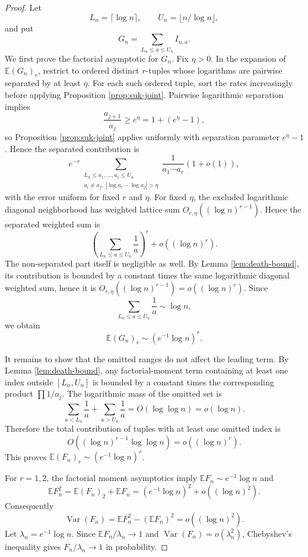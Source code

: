 \documentclass[11pt]{article}
\theoremstyle{remark}
\newcommand{\Ee}{\mathbb E}
\newcommand{\Var}{\operatorname{Var}}
\begin{document}
\begin{proof}
Let
\[
        L_n=\lceil\log n\rceil,
        \qquad
        U_n=\lfloor n/\log n\rfloor,
\]
and put
\[
        G_n=\sum_{L_n\le a\le U_n}I_{n,a}.
\]
We first prove the factorial asymptotic for \(G_n\).  Fix \(\eta>0\).  In the expansion of \(\Ee(G_n)_r\), restrict to ordered distinct \(r\)-tuples whose logarithms are pairwise separated by at least \(\eta\).  For each such ordered tuple, sort the rates increasingly before applying Proposition \ref{prop:suk-joint}.  Pairwise logarithmic separation implies
\[
        \frac{a_{j+1}}{a_j}\ge e^\eta=1+(e^\eta-1),
\]
so Proposition \ref{prop:suk-joint} applies uniformly with separation parameter \(e^\eta-1\).  Hence the separated contribution is
\[
        e^{-r}
        \sum_{\substack{L_n\le a_1,\ldots,a_r\le U_n\\
                         a_i\ne a_j,\ |\log a_i-\log a_j|>\eta}}
        \frac1{a_1\cdots a_r}(1+o(1)),
\]
with the error uniform for fixed \(r\) and \(\eta\).  For fixed \(\eta\), the excluded logarithmic diagonal neighborhood has weighted lattice sum \(O_{r,\eta}((\log n)^{r-1})\).  Hence the separated weighted sum is
\[
        \left(\sum_{L_n\le a\le U_n}\frac1a\right)^r+o((\log n)^r).
\]
The non-separated part itself is negligible as well.  By Lemma \ref{lem:death-bound}, its contribution is bounded by a constant times the same logarithmic diagonal weighted sum, hence it is \(O_{r,\eta}((\log n)^{r-1})=o((\log n)^r)\).  Since
\[
        \sum_{L_n\le a\le U_n}\frac1a\sim \log n,
\]
we obtain
\[
        \Ee(G_n)_r\sim (e^{-1}\log n)^r.
\]

It remains to show that the omitted ranges do not affect the leading term.  By Lemma \ref{lem:death-bound}, any factorial-moment term containing at least one index outside \([L_n,U_n]\) is bounded by a constant times the corresponding product \(\prod 1/a_j\).  The logarithmic mass of the omitted set is
\[
        \sum_{a<L_n}\frac1a+
        \sum_{a>U_n}\frac1a
        =O(\log\log n)=o(\log n).
\]
Therefore the total contribution of tuples with at least one omitted index is
\[
        O((\log n)^{r-1}\log\log n)=o((\log n)^r).
\]
This proves \(\Ee(F_n)_r\sim(e^{-1}\log n)^r\).

For \(r=1,2\), the factorial moment asymptotics imply \(\Ee F_n\sim e^{-1}\log n\) and
\[
        \Ee F_n^2=\Ee(F_n)_2+\Ee F_n
        =(e^{-1}\log n)^2+o((\log n)^2).
\]
Consequently
\[
        \Var(F_n)=\Ee F_n^2-(\Ee F_n)^2=o((\log n)^2).
\]
Let \(\lambda_n=e^{-1}\log n\).  Since \(\Ee F_n/\lambda_n\to1\) and
\(\Var(F_n)=o(\lambda_n^2)\), Chebyshev's inequality gives
\(F_n/\lambda_n\to1\) in probability.
\end{proof}
\end{document}

